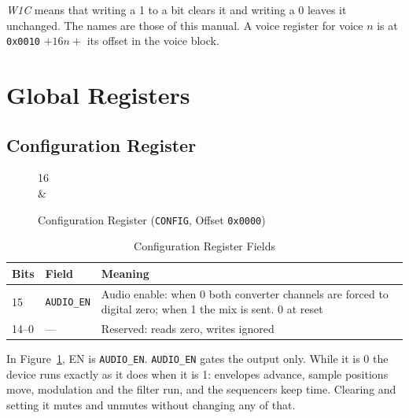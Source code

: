 \emph{W1C} means that writing a 1 to a bit clears it and writing a 0 leaves it unchanged. The names are those of this
manual. A voice register for voice $n$ is at \texttt{0x0010} $+ 16n +$ its offset in the voice block.

\section{Global Registers}

\subsection{Configuration Register}
\label{sec:reg-config}

\begin{figure}[H]
	\centering
	\begin{bytefield}[bitwidth=2em]{16}
		 \\
		 &
	\end{bytefield}
	\caption{Configuration Register (\texttt{CONFIG}, Offset \texttt{0x0000})}
	\label{fig:reg-config}
\end{figure}

\begin{table}[H]
	\centering
	\begin{tabular}{llp{8.0cm}}
		\toprule
		\textbf{Bits} & \textbf{Field}     & \textbf{Meaning}                                                                                            \\
		\midrule
		15            & \texttt{AUDIO\_EN} & Audio enable: when 0 both converter channels are forced to digital zero; when 1 the mix is sent. 0 at reset \\
		14--0         & ---                & Reserved: reads zero, writes ignored                                                                        \\
		\bottomrule
	\end{tabular}
	\caption{Configuration Register Fields}
	\label{tab:reg-config-fields}
\end{table}

In Figure~\ref{fig:reg-config}, EN is \texttt{AUDIO\_EN}. \texttt{AUDIO\_EN} gates the output only. While it is 0 the
device runs exactly as it does when it is 1: envelopes advance, sample positions move, modulation and the filter run,
and the sequencers keep time. Clearing and setting it mutes and unmutes without changing any of that.

